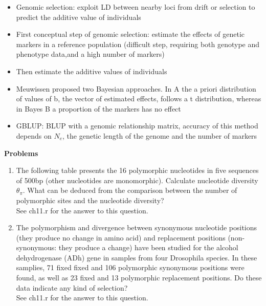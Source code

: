 \documentclass[12pt]{amsart}
\begin{document}
\begin{itemize}
\item Genomic selection: exploit LD between nearby loci from drift or selection to predict the additive value of individuals 
\item First conceptual step of genomic selection: estimate the effects of genetic markers in a reference population (difficult step, requiring both genotype and phenotype data,and a high number of markers)
\item Then estimate the additive values of individuals  
\item Meuwissen proposed two Bayesian approaches. In A the a priori distribution of values of b, the vector of estimated effects, follows a t distribution, whereas in Bayes B a proportion of the markers has no effect
\item GBLUP: BLUP with a genomic relationship matrix, accuracy of this method depends on $N_e$, the genetic length of the genome and the number of markers 
\end{itemize}

{\large \bf Problems}   
\begin{enumerate}
\item The following table presents the 16 polymorphic nucleotides in five sequences of 500bp (other nucleotides are monomorphic). Calculate nucleotide diversity $\theta_{\pi}$. What can be deduced from the comparison between the number of polymorphic sites and the nucleotide diversity?\\
See ch11.r for the answer to this question.

\item The polymorphism and divergence between synonymous nucleotide positions (they produce no change in amino acid) and replacement positions (non-synonymous: they produce a change) have been studied for the alcohol dehydrogenase (ADh) gene in samples from four Drosophila species. In these samplies, 71 fixed fixed and 106 polymorphic synonymous positions were found, as well as 23 fixed and 13 polymorphic replacement positions. Do these data indicate any kind of selection?\\
See ch11.r for the answer to this question.

\end{enumerate}
\end{document}
